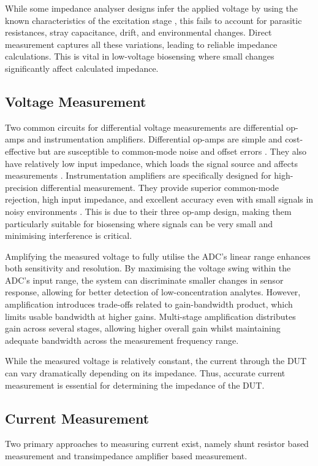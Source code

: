 While some impedance analyser designs infer the applied voltage by using the known characteristics of the excitation stage \cite{buscagliaSimpleZLowCostPortable2023}, this fails to account for parasitic resistances, stray capacitance, drift, and environmental changes. Direct measurement captures all these variations, leading to reliable impedance calculations. This is vital in low-voltage biosensing where small changes significantly affect calculated impedance.

\subsection{Voltage Measurement}
Two common circuits for differential voltage measurements are differential op-amps and instrumentation amplifiers. Differential op-amps are simple and cost-effective but are susceptible to common-mode noise and offset errors \cite{technologyWhatAreDrawbacks2024}. They also have relatively low input impedance, which loads the signal source and affects measurements \cite{technologyWhatAreDrawbacks2024}. Instrumentation amplifiers are specifically designed for high-precision differential measurement. They provide superior common-mode rejection, high input impedance, and excellent accuracy even with small signals in noisy environments \cite{InstrumentationAmplifierOperational}. This is due to their three op-amp design, making them particularly suitable for biosensing where signals can be very small and minimising interference is critical.

Amplifying the measured voltage to fully utilise the \ac{ADC}'s linear range enhances both sensitivity and resolution. By maximising the voltage swing within the \ac{ADC}'s input range, the system can discriminate smaller changes in sensor response, allowing for better detection of low-concentration analytes. However, amplification introduces trade-offs related to gain-bandwidth product, which limits usable bandwidth at higher gains. Multi-stage amplification distributes gain across several stages, allowing higher overall gain whilst maintaining adequate bandwidth across the measurement frequency range.

While the measured voltage is relatively constant, the current through the \ac{DUT} can vary dramatically depending on its impedance. Thus, accurate current measurement is essential for determining the impedance of the \ac{DUT}.

\subsection{Current Measurement}
Two primary approaches to measuring current exist, namely shunt resistor based measurement and transimpedance amplifier based measurement.


